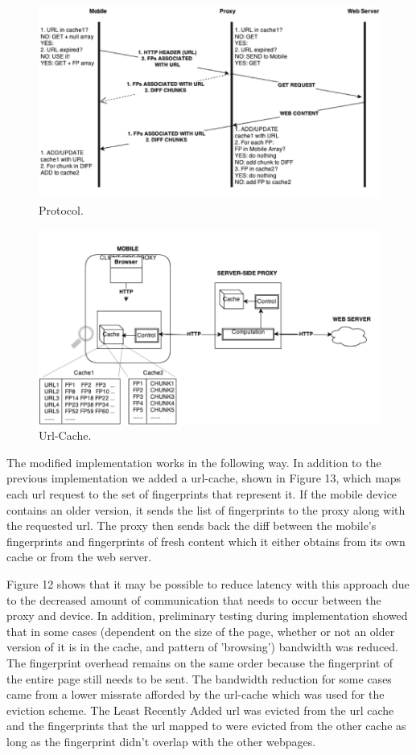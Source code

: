 \begin{figure}[h] 
\centering \includegraphics[width=\columnwidth]{images/urlcache-protocol.png}
\caption{Protocol. }
\end{figure} 
\begin{figure}[h] 
\centering \includegraphics[width=\columnwidth]{images/url-cache-hl.png}
\caption{Url-Cache. }
\end{figure} 

The modified implementation works in the following way. In addition to the previous implementation we added a url-cache, shown in Figure 13, which maps each url request to the set of fingerprints that represent it. If the mobile device contains an older version, it sends the list of fingerprints to the proxy along with the requested url. The proxy then sends back the diff between the mobile's fingerprints and fingerprints of fresh content which it either obtains from its own cache or from the web server. 

Figure 12 shows that it may be possible to reduce latency with this approach due to the decreased amount of communication that needs to occur between the proxy and device. In addition, preliminary testing during implementation showed that in some cases (dependent on the size of the page, whether or not an older version of it is in the cache, and pattern of 'browsing') bandwidth was reduced. The fingerprint overhead remains on the same order because the fingerprint of the entire page still needs to be sent. The bandwidth reduction for some cases came from a lower missrate afforded by the url-cache which was used for the eviction scheme. The Least Recently Added url was evicted from the url cache and the fingerprints that the url mapped to were evicted from the other cache as long as the fingerprint didn't overlap with the other webpages.

